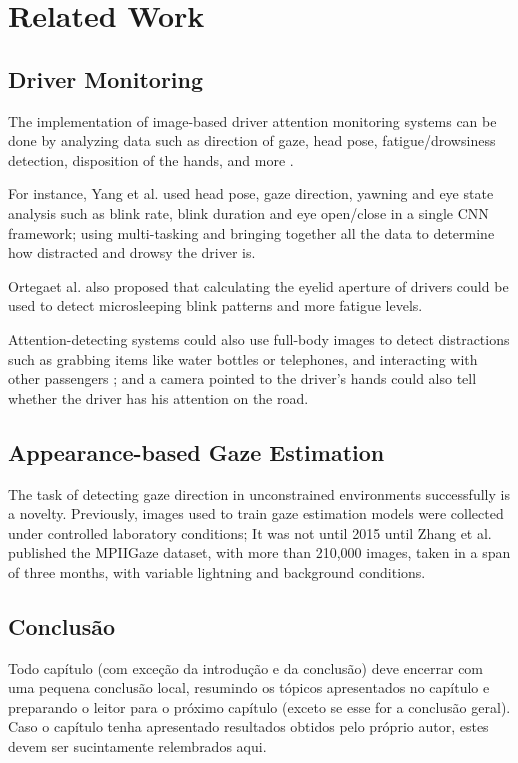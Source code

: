 \chapter{Related Work}


\section{Driver Monitoring}

The implementation of image-based driver attention monitoring systems can be done by analyzing data such as direction of gaze, head pose, fatigue/drowsiness detection, disposition of the hands, and more \cite{jOrtega2020}.

For instance, Yang et al. \cite{9053659} used head pose, gaze direction, yawning and eye state analysis such as blink rate, blink duration and eye open/close in a single CNN framework; using multi-tasking and bringing together all the data to determine how distracted and drowsy the driver is.

Ortegaet al. \cite{eyelid_aperture} also proposed that calculating the eyelid aperture of drivers could be used to detect microsleeping blink patterns and more fatigue levels.

Attention-detecting systems could also use full-body images to detect distractions such as grabbing items like water bottles or telephones, and interacting with other passengers \cite{jOrtega2020}; and a camera pointed to the driver's hands could also tell whether the driver has his attention on the road.

\section{Appearance-based Gaze Estimation}

The task of detecting gaze direction in unconstrained environments successfully is a novelty. Previously, images used to train gaze estimation models were collected under controlled laboratory conditions; It was not until 2015 until Zhang et al.\cite{7299081} published the MPIIGaze dataset, with more than 210,000 images, taken in a span of three months, with variable lightning and background conditions.



\section{Conclusão}

Todo capítulo (com exceção da introdução e da conclusão) deve encerrar com uma pequena conclusão local, resumindo os tópicos apresentados no capítulo e preparando o leitor para o próximo capítulo (exceto se esse for a conclusão geral). Caso o capítulo tenha apresentado resultados obtidos pelo próprio autor, estes devem ser sucintamente relembrados aqui.

